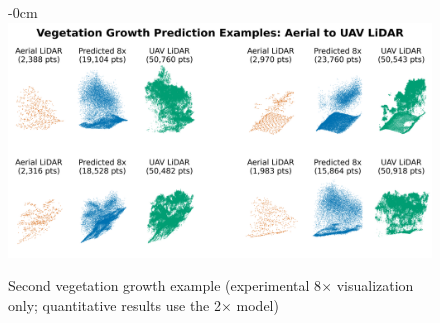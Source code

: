 \documentclass[remotesensing,article,accept,pdftex,moreauthors]{Definitions/mdpi}
\renewcommand{\hl}[1]{#1}
\begin{document}
\begin{figure}[H]
\begin{adjustwidth}{-\extralength}{0cm}
    \centering
    \includegraphics[width=0.98\linewidth]{figures/veg_growth2_8x.png}
    \end{adjustwidth}
    \caption{\hl{Second} %
vegetation growth example (experimental 8$\times$ visualization only; quantitative results use the 2$\times$ model) }
    \label{fig:appendix_growth2}
\end{figure}

\vspace{-11pt}

\end{document}
